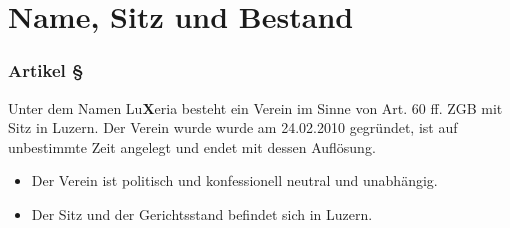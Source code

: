 \section{Name, Sitz und Bestand}

\subsubsection*{Artikel §\articlenumber}
Unter dem Namen Lu\textbf{X}eria besteht ein Verein im Sinne von Art. 60 ff.
ZGB mit Sitz in Luzern. Der Verein wurde wurde am 24.02.2010 gegründet, ist
auf unbestimmte Zeit angelegt und endet mit dessen Auflösung.

\begin{itemize}
	\item Der Verein ist politisch und konfessionell neutral und
		unabhängig.
	\item Der Sitz und der Gerichtsstand befindet sich in Luzern.
\end{itemize}
